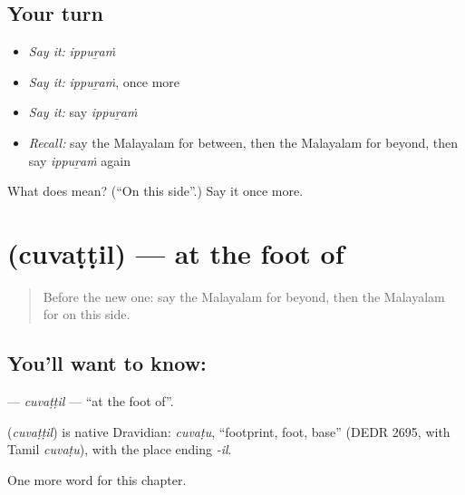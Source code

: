 \subsection*{Your turn}
\begin{itemize}
\raggedright
  \item \emph{Say it:} \emph{ippuṟaṁ}
  \item \emph{Say it:} \emph{ippuṟaṁ}, once more
  \item \emph{Say it:} say \emph{ippuṟaṁ}
  \item \emph{Recall:} say the Malayalam for between, then the Malayalam for beyond, then say \emph{ippuṟaṁ} again
\end{itemize}

\begin{tcolorbox}[breakable,colback=teal!4,colframe=teal!35!black,title={Before you move on}]
What does  mean? (\textquotedblleft{}On this side\textquotedblright{}.) Say it once more.
\end{tcolorbox}
\section[\texorpdfstring{\ml{ചുവട്ടിൽ} (cuvaṭṭil)}{ചുവട്ടിൽ (cuvaṭṭil)}]{ (cuvaṭṭil) — at the foot of}

\label{lesson:ML-C199-cuvattil}



\begin{quote}
Before the new one: say the Malayalam for beyond, then the Malayalam for on this side.
\end{quote}

\subsection*{You'll want to know: }
\textbf{} — \emph{cuvaṭṭil} — \textquotedblleft{}at the foot of\textquotedblright{}.

\begin{cousinweb}
\textbf{} (\emph{cuvaṭṭil}) is native Dravidian: \emph{cuvaṭu}, \textquotedblleft{}footprint, foot, base\textquotedblright{} (DEDR 2695, with Tamil \emph{cuvaṭu}), with the place ending \emph{-il}.
\end{cousinweb}

\begin{grammarlens}[title={What you've built}]
One more word for this chapter.
\end{grammarlens}


